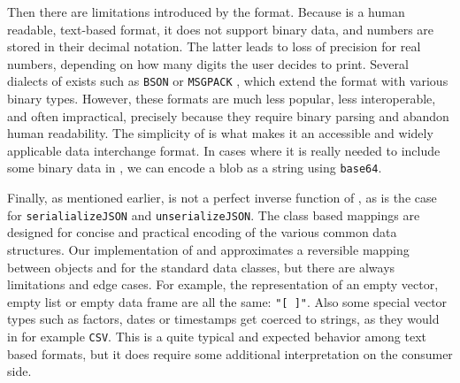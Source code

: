Then there are limitations introduced by the format. Because \JSON is a human readable, text-based format, it does not support binary data, and numbers are stored in their decimal notation. The latter leads to loss of precision for real numbers, depending on how many digits the user decides to print. Several dialects of \JSON exists such as \texttt{BSON} \citep{chodorow2013mongodb} or \texttt{MSGPACK} \citep{msgpack}, which extend the format with various binary types. However, these formats are much less popular, less interoperable, and often impractical, precisely because they require binary parsing and abandon human readability. The simplicity of \JSON is what makes it an accessible and widely applicable data interchange format. In cases where it is really needed to include some binary data in \JSON, we can encode a blob as a string using \texttt{base64}.

Finally, as mentioned earlier, \fromJSON is not a perfect inverse function of \toJSON, as is the case for \texttt{serialializeJSON} and \texttt{unserializeJSON}. The class based mappings are designed for concise and practical encoding of the various common data structures. Our implementation of \toJSON and \fromJSON approximates a reversible mapping between \R objects and \JSON for the standard data classes, but there are always limitations and edge cases. For example, the \JSON representation of an empty vector, empty list or empty data frame are all the same: \texttt{"[ ]"}. Also some special vector types such as factors, dates or timestamps get coerced to strings, as they would in for example \texttt{CSV}. This is a quite typical and expected behavior among text based formats, but it does require some additional interpretation on the consumer side.

